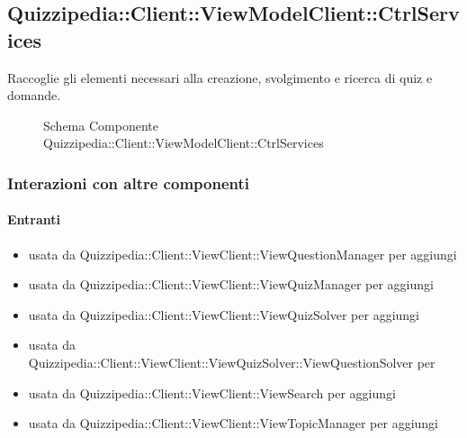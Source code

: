 \subsection{Quizzipedia::Client::ViewModelClient::CtrlServices}
Raccoglie gli elementi necessari alla creazione, svolgimento e ricerca di quiz e domande.
\begin{figure}[H]
\centering
\noindent{}
\caption[Schema Componente Quizzipedia::Client::ViewModelClient::CtrlServices]{Schema Componente Quizzipedia::Client::ViewModelClient::CtrlServices}
\end{figure}
\subsubsection{Interazioni con altre componenti}
\paragraph{Entranti}
\begin{itemize}
\item usata da Quizzipedia::Client::ViewClient::ViewQuestionManager per aggiungi
\item usata da Quizzipedia::Client::ViewClient::ViewQuizManager per aggiungi
\item usata da Quizzipedia::Client::ViewClient::ViewQuizSolver per aggiungi
\item usata da Quizzipedia::Client::ViewClient::ViewQuizSolver::ViewQuestionSolver per 
\item usata da Quizzipedia::Client::ViewClient::ViewSearch per aggiungi
\item usata da Quizzipedia::Client::ViewClient::ViewTopicManager per aggiungi
\end{itemize}
